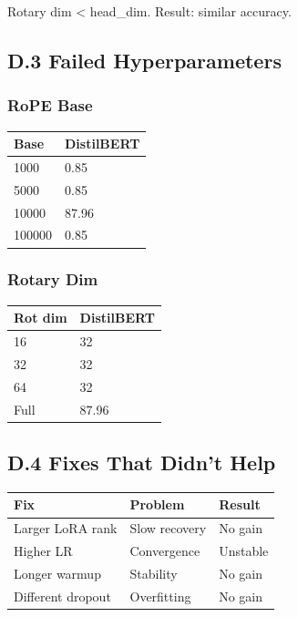 Rotary dim \textless{} head\_dim. Result: similar accuracy.

\subsection{D.3 Failed Hyperparameters}

\subsubsection{RoPE Base}

\begin{table}[H]
\centering
\small
\begin{tabular}{ll}
\toprule
\textbf{Base} & \textbf{DistilBERT} \\
\midrule
1000 & 0.85 \\
5000 & 0.85 \\
10000 & 87.96 \\
100000 & 0.85 \\
\bottomrule
\end{tabular}
\end{table}

\subsubsection{Rotary Dim}

\begin{table}[H]
\centering
\small
\begin{tabular}{ll}
\toprule
\textbf{Rot dim} & \textbf{DistilBERT} \\
\midrule
16 & 32 \\
32 & 32 \\
64 & 32 \\
Full & 87.96 \\
\bottomrule
\end{tabular}
\end{table}

\subsection{D.4 Fixes That Didn't Help}

\begin{table}[H]
\centering
\small
\begin{tabular}{lll}
\toprule
\textbf{Fix} & \textbf{Problem} & \textbf{Result} \\
\midrule
Larger LoRA rank & Slow recovery & No gain \\
Higher LR & Convergence & Unstable \\
Longer warmup & Stability & No gain \\
Different dropout & Overfitting & No gain \\
\bottomrule
\end{tabular}
\end{table}

